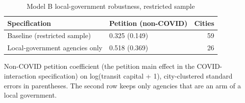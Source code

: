 \begin{table}

\caption{\label{tab:tab-robust-B}Model B local-government robustness, restricted sample}
\centering
\begin{threeparttable}
\begin{tabular}[t]{llr}
\toprule
Specification & Petition (non-COVID) & Cities\\
\midrule
Baseline (restricted sample) & 0.325 (0.149) & 59\\
Local-government agencies only & 0.518 (0.369) & 26\\
\bottomrule
\end{tabular}
\begin{tablenotes}[para]
\item Non-COVID petition coefficient (the petition main effect in the COVID-interaction specification) on log(transit capital + 1), city-clustered standard errors in parentheses. The second row keeps only agencies that are an arm of a local government.
\end{tablenotes}
\end{threeparttable}
\end{table}
